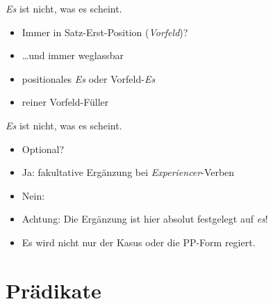 \begin{frame}
  {\textit{Es} ist nicht, was es scheint.}
  \begin{exe}
    \ex
    \begin{xlist}
    \end{xlist}
  \end{exe}
  \pause
  \begin{itemize}[<+->]
    \item Immer in Satz-Erst-Position (\textit{Vorfeld})?
    \item \ldots und immer weglassbar
    \item \alert{positionales \textit{Es}} oder \alert{Vorfeld-\textit{Es}}
    \item reiner Vorfeld-Füller
  \end{itemize}
\end{frame}

\begin{frame}
  {\textit{Es} ist nicht, was es scheint.}
  \begin{exe}
    \ex
    \begin{xlist}
    \end{xlist}
  \end{exe}
  \pause
  \begin{itemize}[<+->]
    \item Optional?
    \item Ja: \alert{fakultative Ergänzung bei \textit{Experiencer}-Verben}
    \item Nein: 
      \Halbzeile
    \item Achtung: Die Ergänzung ist hier absolut festgelegt auf \textit{es}!
    \item Es wird nicht nur der Kasus oder die PP-Form regiert.
  \end{itemize}
\end{frame}


\section{Prädikate}

